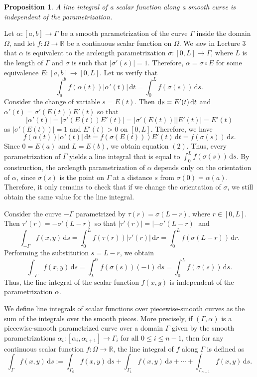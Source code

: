 \documentclass[10pt]{article}
\makeatletter
\newcommand{\R}{\mathbb{R}}
\newcommand{\dd}{\,\mathrm{d}}
\theoremstyle{newstyle}
\newtheorem{prop}[thm]{Proposition}
\newenvironment{pf}[1][\proofname]{\par
  \pushQED{\qed}%
  \normalfont \topsep0\p@\relax
  \trivlist
  \item[\hskip\labelsep\scshape
  #1\@addpunct{.}]\ignorespaces
}{%
  \popQED\endtrivlist\@endpefalse
}
\makeatother
\begin{document}
\begin{prop}
A line integral of a scalar function
along a smooth curve is independent of the parametrization.
\end{prop}
\begin{pf}
Let $\alpha : [a, b] \to \Gamma$ be a smooth parametrization of the curve 
$\Gamma$ inside the domain $\Omega$, and let $f : \Omega \to \R$ be a continuous 
scalar function on $\Omega$. We saw in Lecture 3 that $\alpha$ is equivalent to the 
arclength parametrization $\sigma : [0, L] \to \Gamma$, where $L$ is the length 
of $\Gamma$ and $\sigma$ is such that $|\sigma'(s)| = 1$. 
Therefore, $\alpha = \sigma \circ E$ for some equivalence $E : [a, b] \to [0, L]$. 
Let us verify that
\[ \int_a^b f(\alpha(t))|\alpha'(t)|\dd t = \int_0^L f(\sigma(s)) \dd s. \tag{$2$} \]
Consider the change of variable $s = E(t)$. Then ${\rm d}s = E'(t) \dd t$ and 
$\alpha'(t) = \sigma'(E(t)) E'(t)$ so that 
\[ |\alpha'(t)| = |\sigma'(E(t)) E'(t)| = |\sigma'(E(t))| |E'(t)| = E'(t) \]
as $|\sigma'(E(t))| = 1$ and $E'(t) > 0$ on $[0, L]$. Therefore, we have 
\[ f(\alpha(t)) |\alpha'(t)| \dd t = f(\sigma(E(t))) E'(t) \dd t = 
f(\sigma(s)) \dd s. \]
Since $0 = E(a)$ and $L = E(b)$, we obtain equation $(2)$. Thus, every parametrization 
of $\Gamma$ yields a line integral that is equal to $\int_0^L f(\sigma(s)) \dd s$. 
By construction, the arclength parametrization of $\alpha$ depends only on the 
orientation of $\alpha$, since $\sigma(s)$ is the point on $\Gamma$ at a distance $s$ 
from $\sigma(0) = \alpha(a)$. Therefore, it only remains to check that if we change the 
orientation of $\sigma$, we still obtain the same value for the line integral. 

Consider the curve $-\Gamma$ parametrized by $\tau(r) = \sigma(L-r)$, where $r \in [0, L]$.
Then $\tau'(r) = -\sigma'(L-r)$ so that $|\tau'(r)| = |{-\sigma'(L-r)}|$ and 
\[ \int_{-\Gamma} f(x, y)\dd s = \int_0^L f(\tau(r))|\tau'(r)|\dd r = \int_0^L f(\sigma(L-r))\dd r. \]
Performing the substitution $s = L-r$, we obtain 
\[ \int_{-\Gamma} f(x, y) \dd s = \int_L^0 f(\sigma(s)) (-1)\dd s = \int_0^L f(\sigma(s)) \dd s. \]
Thus, the line integral of the scalar function $f(x, y)$ is independent of the parametrization $\alpha$. 
\end{pf}

We define line integrals of 
scalar functions over piecewise-smooth curves as the sum of the integrals over the 
smooth pieces. More precisely, if $(\Gamma, \alpha)$ is a piecewise-smooth parametrized curve 
over a domain $\Gamma$ given by the smooth parametrizations 
$\alpha_i : [\alpha_i, \alpha_{i+1}] \to \Gamma_i$ for all $0 \leq i \leq n-1$, then for 
any continuous scalar function $f : \Omega \to \R$, the line integral of $f$ 
along $\Gamma$ is defined as 
\[ \int_\Gamma f(x, y)\dd s := \int_{\Gamma_0} f(x, y)\dd s + \int_{\Gamma_1} f(x, y)\dd s 
+ \cdots + \int_{\Gamma_{n-1}} f(x, y)\dd s. \]
\end{document}

